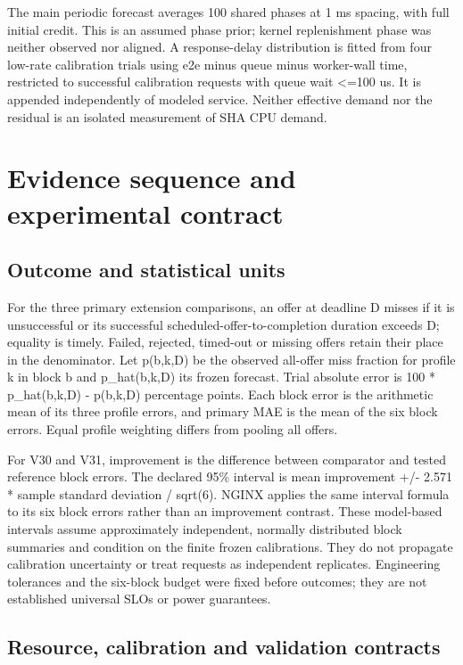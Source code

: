 \documentclass[11pt,a4paper]{article}
\begin{document}
The main periodic forecast averages 100 shared phases at 1 ms spacing, with
full initial credit. This is an assumed phase prior; kernel replenishment phase
was neither observed nor aligned. A response-delay distribution is fitted
from four low-rate calibration trials using e2e minus queue minus worker-wall
time, restricted to successful calibration requests with queue wait <=100 us.
It is appended independently of modeled service. Neither effective demand nor
the residual is an isolated measurement of SHA CPU demand.

\section{Evidence sequence and experimental contract}

\subsection{Outcome and statistical units}

For the three primary extension comparisons, an offer at deadline D misses if
it is unsuccessful or its successful
scheduled-offer-to-completion duration exceeds D; equality is timely. Failed,
rejected, timed-out or missing offers retain their place in the denominator.
Let p(b,k,D) be the observed all-offer miss fraction for profile k in block b
and p\_hat(b,k,D) its frozen forecast. Trial absolute error is
100 * \textbar{}p\_hat(b,k,D) - p(b,k,D)\textbar{} percentage points. Each block error is the
arithmetic mean of its three profile errors, and primary MAE is the mean of
the six block errors. Equal profile weighting differs from pooling all offers.

For V30 and V31, improvement is the difference between comparator and tested
reference block errors. The declared 95\% interval is mean improvement +/-
2.571 * sample standard deviation / sqrt(6). NGINX applies the same interval
formula to its six block errors rather than an improvement contrast. These
model-based intervals assume approximately independent, normally distributed
block summaries and condition on the finite frozen calibrations. They do not
propagate calibration uncertainty or treat requests as independent replicates.
Engineering tolerances and the six-block budget were fixed before outcomes;
they are not established universal SLOs or power guarantees.

\subsection{Resource, calibration and validation contracts}
\end{document}
